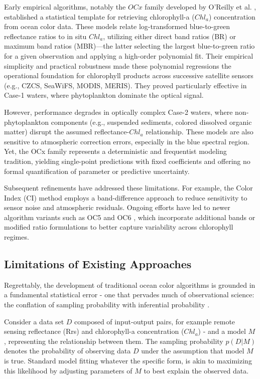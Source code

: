 \documentclass[preprint,authoryear]{elsarticle}
\begin{document}
Early empirical algorithms, notably the $OCx$ family developed by O’Reilly et al. \citep{oreilly1998, oreilly2000}, established a statistical template for retrieving chlorophyll-a ($Chl_a$) concentration from ocean color data. These models relate log-transformed blue-to-green reflectance ratios to in situ $Chl_a$, utilizing either direct band ratios (BR) or maximum band ratios (MBR)—the latter selecting the largest blue-to-green ratio for a given observation and applying a high-order polynomial fit. Their empirical simplicity and practical robustness made these polynomial regressions the operational foundation for chlorophyll products across successive satellite sensors (e.g., CZCS, SeaWiFS, MODIS, MERIS). They proved particularly effective in Case-1 waters, where phytoplankton dominate the optical signal.

However, performance degrades in optically complex Case-2 waters, where non-phytoplankton components (e.g., suspended sediments, colored dissolved organic matter) disrupt the assumed reflectance-$Chl_a$ relationship. These models are also sensitive to atmospheric correction errors, especially in the blue spectral region. Yet, the OCx family represents a deterministic and frequentist modeling tradition, yielding single-point predictions with fixed coefficients and offering no formal quantification of parameter or predictive uncertainty.

Subsequent refinements have addressed these limitations. For example, the Color Index (CI) method \citep{hu2012} employs a band-difference approach to reduce sensitivity to sensor noise and atmospheric residuals. Ongoing efforts have led to newer algorithm variants such as OC5 and OC6 \citep{oreilly2019}, which incorporate additional bands or modified ratio formulations to better capture variability across chlorophyll regimes.


\subsection{Limitations of Existing Approaches}

Regrettably, the development of traditional ocean color algorithms is grounded in a fundamental statistical error - one that pervades much of observational science: the conflation of sampling probability with inferential probability \citep{jaynes2003probability,descheemaekere2011}.

Consider a data set $D$ composed of input-output pairs, for example remote sensing reflectance (Rrs) and chlorophyll-a concentration ($Chl_a$) - and a model $M$, representing the relationship between them. The sampling probability $p(D|M)$ denotes the probability of observing data $D$ under the assumption that model $M$ is true. Standard model fitting whatever the specific form, is akin to maximizing this likelihood by adjusting parameters of $M$ to best explain the observed data.
\end{document}
